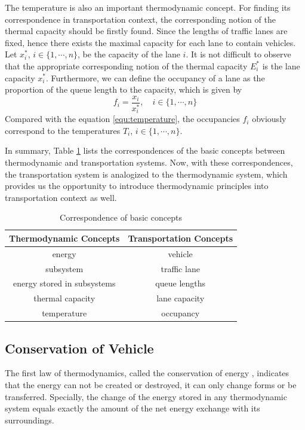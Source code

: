 \documentclass[preprint,authoryear,12pt]{elsarticle}
\begin{document}
The temperature is also an important thermodynamic concept. For finding its correspondence in transportation context, the corresponding notion of the thermal capacity should be firstly found. Since the lengths of traffic lanes are fixed, hence there exists the maximal capacity for each lane to contain vehicles. Let $x_i^*$, $i\in\{1,\cdots,n\}$, be the capacity of the lane $i$. It is not difficult to observe that the appropriate corresponding notion of the thermal capacity $E_i^*$ is the lane capacity $x_i^*$. Furthermore, we can define the occupancy of a lane as the proportion of the queue length to the capacity, which is given by
\begin{equation}\label{equ:occupancy}
f_i = \frac{x_i}{x_i^*},\quad i\in\{1,\cdots,n\}
\end{equation}
Compared with the equation \eqref{equ:temperature}, the occupancies $f_i$ obviously correspond to the temperatures $T_i$, $i\in\{1,\cdots,n\}$.

In summary, Table \ref{tab:notions} lists the correspondences of the basic concepts between thermodynamic and transportation systems. Now, with these correspondences, the transportation system is analogized to the thermodynamic system, which provides us the opportunity to introduce thermodynamic principles into transportation context as well.

\begin{table}[ht]
\centering \caption{Correspondence of basic concepts}
\label{tab:notions}
\begin{tabular}{cc}
  \hline
  Thermodynamic Concepts & Transportation Concepts \\
  \hline
  energy & vehicle \\
  subsystem & traffic lane \\
  energy stored in subsystems & queue lengths \\
  thermal capacity & lane capacity \\
  temperature & occupancy \\
  \hline
\end{tabular}
\end{table}

\subsection{Conservation of Vehicle}

The first law of thermodynamics, called the conservation of energy \citep{cengel_thermodynamics:_2001}, indicates that the energy can not be created or destroyed, it can only change forms or be transferred. Specially, the change of the energy stored in any thermodynamic system equals exactly the amount of the net energy exchange with its surroundings.
\end{document}
